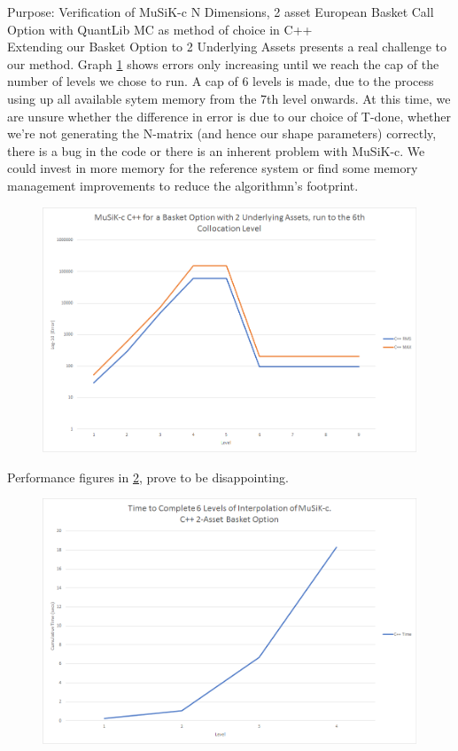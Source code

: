 \documentclass[a4paper]{amsart}
\begin{document}
Purpose: Verification of MuSiK-c N Dimensions, 2 asset European Basket Call Option with QuantLib MC as method of choice in C++\\

Extending our Basket Option to 2 Underlying Assets presents a real challenge to our method. Graph \ref{fig:cppExp7e} shows errors only increasing until we reach the cap of the number of levels we chose to run. A cap of 6 levels is made, due to the process using up all available sytem memory from the 7th level onwards. At this time, we are unsure whether the difference in error is due to our choice of T-done, whether we're not generating the N-matrix (and hence our shape parameters) correctly, there is a bug in the code or there is an inherent problem with MuSiK-c. We could invest in more memory for the reference system or find some memory management improvements to reduce the algorithmn's footprint.

\begin{figure}[h]
\centering
\includegraphics[scale=0.3]{cppExp7-errors.png}
\caption {}
\label {fig:cppExp7e}
\end{figure}

Performance figures in \ref{fig:cppExp7t}, prove to be disappointing.

\begin{figure}[h]
\centering
\includegraphics[scale=0.3]{cppExp7-time.png}
\caption {}
\label {fig:cppExp7t}
\end{figure}
\end{document}
